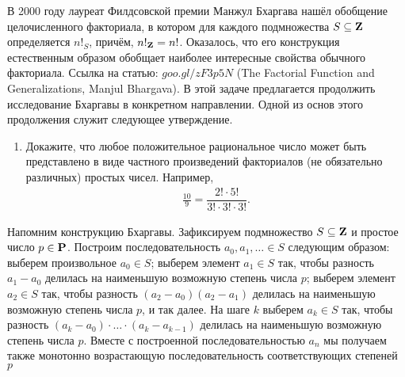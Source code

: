 
В 2000 году лауреат Филдсовской премии Манжул Бхаргава нашёл обобщение целочисленного факториала, в котором для каждого подмножества $S\subseteq \text{\bf Z}$ определяется $n!_S$, причём, $n!_\text{\bf Z} = n!$. Оказалось, что его конструкция естественным образом обобщает наиболее интересные свойства обычного факториала. Ссылка на статью: \href{https://goo.gl/zF3p5N}{$goo.gl/zF3p5N$} (The Factorial Function and Generalizations, Manjul Bhargava). В этой задаче предлагается продолжить исследование Бхаргавы в конкретном направлении. Одной из основ этого продолжения служит следующее утверждение.

\begin{enumerate}
\item Докажите, что любое положительное рациональное число может быть представлено в виде частного произведений факториалов (не обязательно различных) простых чисел. Например, 
\begin{align*}
\frac{10}{9} = \dfrac{2! \cdot 5!}{3! \cdot 3! \cdot 3!}.
\end{align*}
\end{enumerate}

Напомним конструкцию Бхаргавы. Зафиксируем подмножество $S \subseteq \text{\bf Z}$ и простое число $p \in \text{\bf P}$. Построим последовательность $a_0, a_1, \ldots \in S$ следующим образом: выберем произвольное $a_0 \in S$; выберем элемент $a_1 \in S$ так, чтобы разность $a_1 - a_0$ делилась на наименьшую возможную степень числа $p$; выберем элемент $a_2 \in S$ так, чтобы разность $(a_2 - a_0)(a_2 - a_1)$ делилась на наименьшую возможную степень числа $p$, и так далее. На шаге $k$ выберем $a_k \in S$ так, чтобы разность $(a_k - a_0)\cdot \ldots \cdot (a_k - a_{k-1})$ делилась на наименьшую возможную степень числа $p$. Вместе с построенной последовательностью $a_n$ мы получаем также монотонно возрастающую последовательность соответствующих степеней $p$

